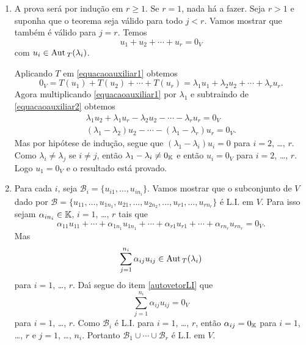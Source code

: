 \begin{prova}
	\begin{enumerate}[label={\roman*})]
		\item A prova ser\'a por indu\c{c}\~ao em $r \ge 1$. Se $r = 1$, nada h\'a a fazer. Seja $r > 1$ e suponha que o teorema seja v\'alido para todo $j < r$. Vamos mostrar que tamb\'em \'e v\'alido para $j = r$. Temos
		\begin{equation}\label{equacaoauxiliar1}
			u_1 + u_2 + \cdots + u_r = 0_V
		\end{equation}
		com $u_i \in {\rm Aut\,}_T(\lambda_i)$.

		Aplicando $T$ em \eqref{equacaoauxiliar1} obtemos
		\begin{equation}\label{equacaoauxiliar2}
			0_V = T(u_1) + T(u_2) + \cdots + T(u_r) = \lambda_1u_1 + \lambda_2u_2 + \cdots + \lambda_ru_r.
		\end{equation}
		Agora multiplicando \eqref{equacaoauxiliar1} por $\lambda_1$ e subtraindo de \eqref{equacaoauxiliar2} obtemos
		\begin{align*}
			\lambda_1u_2 + \lambda_1u_r - \lambda_2u_2 - \cdots - \lambda_ru_r = 0_V\\
			(\lambda_1 - \lambda_2)u_2 - \cdots - (\lambda_1 - \lambda_r)u_r = 0_V.
		\end{align*}
		Mas por hip\'otese de indu\c{c}\~ao, segue que $(\lambda_1 - \lambda_i)u_i = 0$ para $i = 2$, \dots, $r$. Como $\lambda_i \ne \lambda_j$ se $i \ne j$, ent\~ao $\lambda_1 - \lambda_i \ne 0_{\mathbb{K}}$ e ent\~ao $u_i = 0_V$ para $i = 2$, \dots, $r$. Logo $u_1 = 0_V$ e o resultado est\'a provado.
		\item Para cada $i$, seja $\mathcal{B}_i = \{u_{i1}, \dots, u_{in_i}\}$. Vamos mostrar que o subconjunto de $V$ dado por $\mathcal{B} = \{u_{11}, \dots, u_{1n_1}, u_{21}, \dots, u_{2n_2}, \dots, u_{r1}, \dots, u_{rn_r}\}$ \'e L.I. em $V$. Para isso sejam $\alpha_{in_i} \in \mathbb{K}$, $i = 1$, \dots, $r$ tais que
		\[
			\alpha_{11}u_{11} + \cdots + \alpha_{1n_1}u_{1n_1} + \cdots + \alpha_{r1}u_{r1} + \cdots + \alpha_{rn_r}u_{rn_r} = 0_V.
		\]
		Mas
		\[
			\sum_{j = 1}^{n_i}\alpha_{ij}u_{ij} \in {\rm Aut\,}_T(\lambda_i)
		\]
		para $i = 1$, \dots, $r$. Da{\'\i} segue do item \ref{autovetorLI} que
		\[
			\sum_{j = 1}^{n_i}\alpha_{ij}u_{ij} = 0_V
		\]
		para $i = 1$, \dots, $r$. Como $\mathcal{B}_i$ \'e L.I. para $i = 1$, \dots, $r$, ent\~ao $\alpha_{ij} = 0_{\mathbb{K}}$ para $i = 1$, \dots, $r$ e $j = 1$, \dots, $n_i$. Portanto $\mathcal{B}_1 \cup \cdots \cup \mathcal{B}_r$ \'e L.I. em $V$.
	\end{enumerate}
\end{prova}

